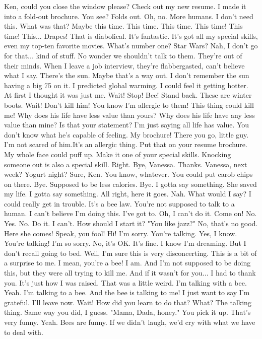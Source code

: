 \documentclass[a4paper,12pt]{article}
\begin{document}
Ken, could you close the window please?
Check out my new resume. I made it into a fold-out brochure. You see? Folds out.
Oh, no. More humans. I don't need this.
What was that?
Maybe this time. This time. This time. This time! This time! This... Drapes!
That is diabolical.
It's fantastic. It's got all my special skills, even my top-ten favorite movies.
What's number one? Star Wars?
Nah, I don't go for that... kind of stuff.
No wonder we shouldn't talk to them. They're out of their minds.
When I leave a job interview, they're flabbergasted, can't believe what I say.
There's the sun. Maybe that's a way out.
I don't remember the sun having a big 75 on it.
I predicted global warming. I could feel it getting hotter. At first I thought it was just me.
Wait! Stop! Bee!
Stand back. These are winter boots.
Wait!
Don't kill him!
You know I'm allergic to them! This thing could kill me!
Why does his life have less value than yours?
Why does his life have any less value than mine? Is that your statement?
I'm just saying all life has value. You don't know what he's capable of feeling.
My brochure!
There you go, little guy.
I'm not scared of him.It's an allergic thing.
 Put that on your resume brochure.
My whole face could puff up.
Make it one of your special skills.
Knocking someone out is also a special skill.
Right. Bye, Vanessa. Thanks.
Vanessa, next week? Yogurt night?
Sure, Ken. You know, whatever.
You could put carob chips on there.
Bye.
Supposed to be less calories.
Bye.
I gotta say something. She saved my life. I gotta say something.
All right, here it goes.
Nah.
What would I say?
I could really get in trouble. It's a bee law. You're not supposed to talk to a human.
I can't believe I'm doing this. I've got to.
Oh, I can't do it. Come on!
No. Yes. No. Do it. I can't.
How should I start it? "You like jazz?" No, that's no good.
Here she comes! Speak, you fool!
Hi!
I'm sorry. You're talking.
Yes, I know.
You're talking!
I'm so sorry.
No, it's OK. It's fine.
I know I'm dreaming. But I don't recall going to bed.
Well, I'm sure this is very disconcerting.
This is a bit of a surprise to me. I mean, you're a bee!
I am. And I'm not supposed to be doing this, but they were all trying to kill me.
And if it wasn't for you... I had to thank you. It's just how I was raised.
That was a little weird. I'm talking with a bee.
Yeah.
I'm talking to a bee. And the bee is talking to me!
I just want to say I'm grateful.
I'll leave now.
Wait! How did you learn to do that?
What?
The talking thing.
Same way you did, I guess. "Mama, Dada, honey." You pick it up.
That's very funny.
Yeah.
Bees are funny. If we didn't laugh, we'd cry with what we have to deal with.
\end{document}
